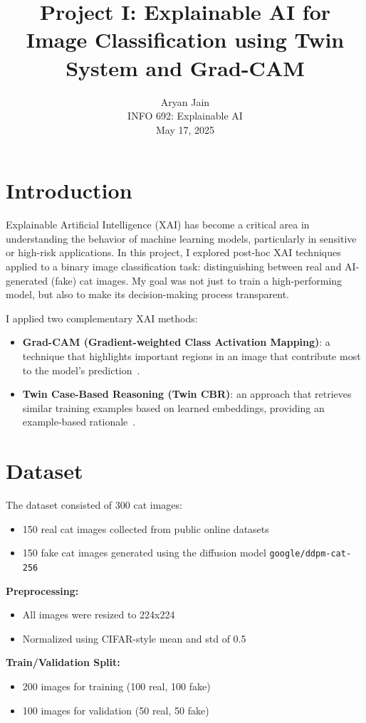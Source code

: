 \documentclass{article}
\title{Project I: Explainable AI for Image Classification using Twin System and Grad-CAM}
\author{Aryan Jain \\
INFO 692: Explainable AI \\
May 17, 2025}
\date{}
\begin{document}
\maketitle

\section{Introduction}
Explainable Artificial Intelligence (XAI) has become a critical area in understanding the behavior of machine learning models, particularly in sensitive or high-risk applications. In this project, I explored post-hoc XAI techniques applied to a binary image classification task: distinguishing between real and AI-generated (fake) cat images. My goal was not just to train a high-performing model, but also to make its decision-making process transparent.

I applied two complementary XAI methods:
\begin{itemize}
    \item \textbf{Grad-CAM (Gradient-weighted Class Activation Mapping)}: a technique that highlights important regions in an image that contribute most to the model's prediction~\cite{gradcam}.
    \item \textbf{Twin Case-Based Reasoning (Twin CBR)}: an approach that retrieves similar training examples based on learned embeddings, providing an example-based rationale~\cite{chen2018, barnett2021}.
\end{itemize}

\section{Dataset}
The dataset consisted of 300 cat images:
\begin{itemize}
    \item 150 real cat images collected from public online datasets
    \item 150 fake cat images generated using the diffusion model \texttt{google/ddpm-cat-256}~\cite{ddpm}
\end{itemize}

\textbf{Preprocessing:}
\begin{itemize}
    \item All images were resized to 224x224
    \item Normalized using CIFAR-style mean and std of 0.5
\end{itemize}

\textbf{Train/Validation Split:}
\begin{itemize}
    \item 200 images for training (100 real, 100 fake)
    \item 100 images for validation (50 real, 50 fake)
\end{itemize}
\end{document}
